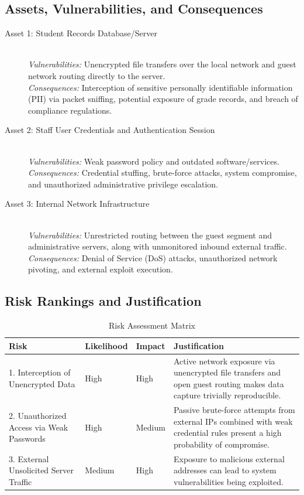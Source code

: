 \documentclass[12pt,a4paper]{article}
\begin{document}
\subsection{Assets, Vulnerabilities, and Consequences}
\begin{description}
    \item[Asset 1: Student Records Database/Server] \hfill \\
    \textit{Vulnerabilities:} Unencrypted file transfers over the local network and guest network routing directly to the server. \\
    \textit{Consequences:} Interception of sensitive personally identifiable information (PII) via packet sniffing, potential exposure of grade records, and breach of compliance regulations.
    
    \item[Asset 2: Staff User Credentials and Authentication Session] \hfill \\
    \textit{Vulnerabilities:} Weak password policy and outdated software/services. \\
    \textit{Consequences:} Credential stuffing, brute-force attacks, system compromise, and unauthorized administrative privilege escalation.
    
    \item[Asset 3: Internal Network Infrastructure] \hfill \\
    \textit{Vulnerabilities:} Unrestricted routing between the guest segment and administrative servers, along with unmonitored inbound external traffic. \\
    \textit{Consequences:} Denial of Service (DoS) attacks, unauthorized network pivoting, and external exploit execution.
\end{description}

\subsection{Risk Rankings and Justification}
\begin{table}[h!]
\centering
\begin{tabular}{l l l p{6cm}}
\toprule
\textbf{Risk} & \textbf{Likelihood} & \textbf{Impact} & \textbf{Justification} \\
\midrule
1. Interception of Unencrypted Data & High & High & Active network exposure via unencrypted file transfers and open guest routing makes data capture trivially reproducible. \\
2. Unauthorized Access via Weak Passwords & High & Medium & Passive brute-force attempts from external IPs combined with weak credential rules present a high probability of compromise. \\
3. External Unsolicited Server Traffic & Medium & High & Exposure to malicious external addresses can lead to system vulnerabilities being exploited. \\
\bottomrule
\end{tabular}
\caption{Risk Assessment Matrix}
\end{table}
\end{document}
